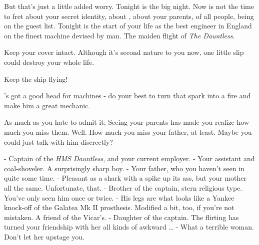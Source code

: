 \documentclass[char]{airship}
\begin{document}
But that's just a little added worry. Tonight is the big night.  Now is not the time to fret about your secret identity, about \cThief{}, about your parents, of all people, being on the guest list. Tonight is the start of your life as the best engineer in England on the finest machine devised by man. The maiden flight of \emph{The Dauntless}.


\begin{itemz}[Goals]
  \item Keep your cover intact. Although it's second nature to you now, one little slip could destroy your whole life. 
  \item Keep the ship flying!
  \item \cRobot{}'s got a good head for machines - do your best to turn that spark into a fire and make him a great mechanic.
  \item As much as you hate to admit it: Seeing your parents has made you realize how much you miss them. Well. How much you miss your father, at least. Maybe you could just talk with him discreetly?
\end{itemz}


\begin{contacts}
  \contact{\cCaptain{}} - Captain of the \emph{HMS Dauntless}, and your current employer.
  \contact{\cRobot{}} - Your assistant and coal-shoveler. A surprisingly sharp boy.
  \contact{\cNoble{}} - Your father, who you haven't seen in quite some time.
  \contact{\cJack{}} - Pleasant as a shark with a spike up its ass, but your mother all the same. Unfortunate, that.
  \contact{\cVicar{}} - Brother of the captain, stern religious type. You've only seen him once or twice.
  \contact{\cCowboy{}} - His legs are what looks like a Yankee knock-off of the Galatea Mk II prosthesis. Modified a bit, too, if you're not mistaken. A friend of the Vicar's. 
  \contact{\cThief{}} - Daughter of the captain. The flirting has turned your friendship with her all kinds of awkward {\ldots}
  \contact{\cCurie{}} - What a terrible woman. Don't let her upstage you.
\end{contacts}
\end{document}
